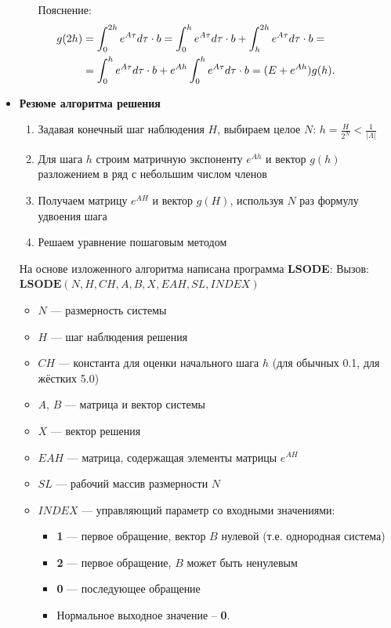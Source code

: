 \begin{itemize}[leftmargin=1em]
\begin{itemize}
			Пояснение: 
			\begin{align}
				\hspace{-5em}g(2h) &= \int_0^{2h} e^{A\tau} d\tau \cdot b = \int_0^h e^{A\tau} d\tau \cdot b + \int_h^{2h} e^{A\tau} d\tau \cdot b = \nonumber\\
				\hspace{-1.5em}&= \int_0^h e^{A\tau} d\tau \cdot b + e^{Ah} \int_0^h e^{A\tau} d\tau \cdot b = (E + e^{Ah}) g(h).
			\end{align}
		\end{itemize}
		\item \textbf{Резюме алгоритма решения}
		\begin{enumerate}
			\item Задавая конечный шаг наблюдения $H$, выбираем целое $N$: 
			\(h = \frac{H}{2^N} < \frac{1}{|\Lambda|}\)
			\item Для шага $h$ строим матричную экспоненту $e^{Ah}$ и вектор $g(h)$ разложением в ряд с небольшим числом членов
			\item Получаем матрицу $e^{AH}$ и вектор $g(H)$, используя $N$ раз формулу удвоения шага
			\item Решаем уравнение пошаговым методом
		\end{enumerate}

		На основе изложенного алгоритма написана программа \textbf{LSODE}:
		\newline
		Вызов:
		\(\textbf{LSODE}(N, H, CH, A, B, X, EAH, SL, INDEX)\)
		
		\begin{itemize}[leftmargin=1.5em]
			\item $N$ — размерность системы
			\item $H$ — шаг наблюдения решения
			\item $CH$ — константа для оценки начального шага $h$ (для обычных 0.1, для жёстких 5.0)
			\item $A$, $B$ — матрица и вектор системы
			\item $X$ — вектор решения
			\item $EAH$ — матрица, содержащая элементы матрицы $e^{AH}$
			\item $SL$ — рабочий массив размерности $N$
			\item $INDEX$ — управляющий параметр со входными значениями:
			\begin{itemize}
				\item \textbf{1} — первое обращение, вектор $B$ нулевой (т.е. однородная система)
				\item \textbf{2} — первое обращение, $B$ может быть ненулевым
				\item \textbf{0} — последующее обращение
				\item Нормальное выходное значение – \textbf{0}. 
			\end{itemize}
		\end{itemize}
	\end{itemize}
	
